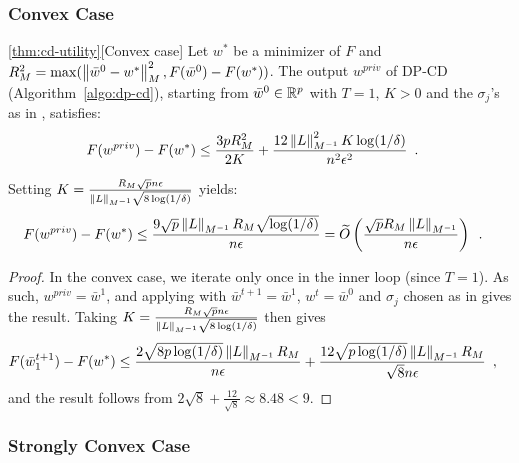 \subsubsection{Convex Case}


\begin{restate-theorem}{\ref{thm:cd-utility}}[Convex case]
Let $w^*$ be a minimizer of $F$ and $R_M^2 = \max(\left \lVert \bar w^0 -
    w^* \right \rVert^2_M, F(\bar w^0) - F(w^*))$.
The output $w^{priv}$ of DP-CD (Algorithm~\ref{algo:dp-cd}), starting from
$\bar w^0 \in \mathbb R^p$ with $T = 1$, $K > 0$ and the $\sigma_j$'s as in
, satisfies:
\begin{align}
  F(w^{priv}) - F(w^*)
   & \le \frac{3p R_M^2}{2K}
  + \frac{12 \left \lVert L \right \rVert_{M^{-1}}^2 K\log(1/\delta)}{n^2\epsilon^2}\enspace.
\end{align}

Setting $K = \frac{R_M \sqrt{p} n \epsilon}{\left \lVert L \right \rVert_{M^{-1}}\sqrt{8\log(1/\delta)}}$
yields:
\begin{align}
  F(w^{priv}) - F(w^*)
   & \le \frac{9\sqrt{p} \left \lVert L \right \rVert_{M^{-1}}R_M \sqrt{\log(1/\delta)}}{n\epsilon}
  = \widetilde O \left( \frac{\sqrt{p} R_M \left \lVert L \right \rVert_{M^{-1}}}{n\epsilon} \right)\enspace.
\end{align}
\end{restate-theorem}

\begin{proof}
  In the convex case, we iterate only once in the inner loop (since $T=1$).
  As such, $w^{priv} = \bar w^{1}$, and applying 
  with $\bar w^{t+1} = \bar w^{1}$, $w^t = \bar w^0$ and $\sigma_j$ chosen as in
   gives the result.
  Taking $K = \frac{R_M \sqrt{p} n \epsilon}{\left \lVert L \right \rVert_{M^{-1}}\sqrt{8\log(1/\delta)}}$
  then gives
  \begin{align}
    F(\bar w^{t+1}_1) - F(w^*)
     & \le \frac{2\sqrt{8p\log(1/\delta)} \left \lVert L \right \rVert_{M^{-1}} R_M}{n\epsilon}
    + \frac{12\sqrt{p\log(1/\delta)}\left \lVert L \right \rVert_{M^{-1}} R_M}{\sqrt{8}n\epsilon}\enspace,
  \end{align}
  and the result follows from $2\sqrt{8} + \frac{12}{\sqrt{8}} \approx 8.48 < 9$.
\end{proof}

\subsubsection{Strongly Convex Case}

